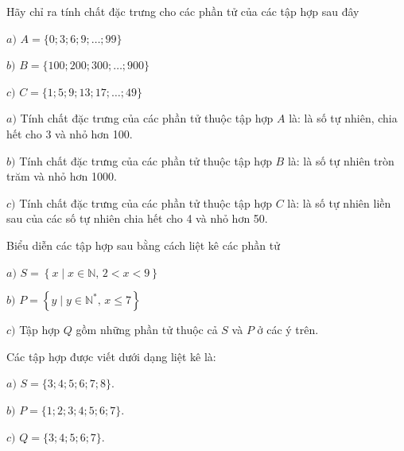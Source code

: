 \begin{bt}
	Hãy chỉ ra tính chất đặc trưng cho các phần tử của các tập hợp sau đây
	
	$a)$ $A = \{0; 3; 6; 9; \ldots; 99\}$
	
	$b)$ $B = \{100; 200; 300; \ldots; 900\}$
	
	$c)$ $C = \{1; 5; 9; 13; 17;\ldots; 49\}$
	\begin{loigiaichuong1}
		$a)$	Tính chất đặc trưng của các phần tử thuộc tập hợp $A$ là: là số tự nhiên, chia hết cho 3 và nhỏ hơn 100.
		
		$b)$	Tính chất đặc trưng của các phần tử thuộc tập hợp $B$ là: là số tự nhiên tròn trăm và nhỏ hơn 1000.
		
		$c)$	Tính chất đặc trưng của các phần tử thuộc tập hợp $C$ là: là số tự nhiên liền sau của các số tự nhiên chia hết cho 4 và nhỏ hơn 50.
	\end{loigiaichuong1}
\end{bt}
\begin{bt}
	Biểu diễn các tập hợp sau bằng cách liệt kê các phần tử
	
	$a)$ $S=\left\{x \mid x \in \mathbb{N},\,2<x<9 \right\}$
	
	$b)$ $P=\left\{ y \mid y \in \mathbb{N^*},\, x\le 7 \right\}$
	
	$c)$ Tập hợp $Q$ gồm những phần tử thuộc cả $S$ và $P$ ở các ý trên.
	\begin{loigiaichuong1}
		Các tập hợp được viết dưới dạng liệt kê là:
		
		$a)$ $S = \{3; 4; 5; 6; 7; 8\}$.
		
		$b)$ $P = \{1; 2; 3; 4; 5; 6; 7\}$.
		
		$c)$ $Q = \{3; 4; 5; 6; 7\}$.
	\end{loigiaichuong1}
\end{bt}
